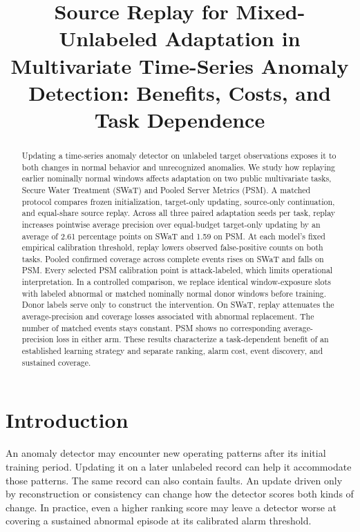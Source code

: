 \documentclass[
  american,
]{article}
\title{Source Replay for Mixed-Unlabeled Adaptation in Multivariate
Time-Series Anomaly Detection: Benefits, Costs, and Task Dependence}
\author{}
\date{}
\begin{document}
\maketitle
\begin{abstract}
Updating a time-series anomaly detector on unlabeled target observations
exposes it to both changes in normal behavior and unrecognized
anomalies. We study how replaying earlier nominally normal windows
affects adaptation on two public multivariate tasks, Secure Water
Treatment (SWaT) and Pooled Server Metrics (PSM). A matched protocol
compares frozen initialization, target-only updating, source-only
continuation, and equal-share source replay. Across all three paired
adaptation seeds per task, replay increases pointwise average precision
over equal-budget target-only updating by an average of 2.61 percentage
points on SWaT and 1.59 on PSM. At each model's fixed empirical
calibration threshold, replay lowers observed false-positive counts on
both tasks. Pooled confirmed coverage across complete events rises on
SWaT and falls on PSM. Every selected PSM calibration point is
attack-labeled, which limits operational interpretation. In a controlled
comparison, we replace identical window-exposure slots with labeled
abnormal or matched nominally normal donor windows before training.
Donor labels serve only to construct the intervention. On SWaT, replay
attenuates the average-precision and coverage losses associated with
abnormal replacement. The number of matched events stays constant. PSM
shows no corresponding average-precision loss in either arm. These
results characterize a task-dependent benefit of an established learning
strategy and separate ranking, alarm cost, event discovery, and
sustained coverage.
\end{abstract}

\section{Introduction}\label{introduction}

An anomaly detector may encounter new operating patterns after its
initial training period. Updating it on a later unlabeled record can
help it accommodate those patterns. The same record can also contain
faults. An update driven only by reconstruction or consistency can
change how the detector scores both kinds of change. In practice, even a
higher ranking score may leave a detector worse at covering a sustained
abnormal episode at its calibrated alarm threshold.
\end{document}
